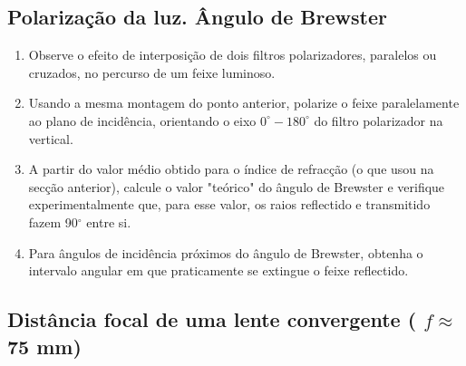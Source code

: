 \documentclass[a4paper,twoside,11pt]{report}      %
\begin{document}
\subsection{\sf Polarização da luz. Ângulo de Brewster}
\begin{enumerate}
\item Observe o efeito de interposição de dois filtros polarizadores, paralelos ou cruzados, no percurso de um feixe luminoso. 
\item Usando a mesma montagem do ponto anterior, polarize o feixe paralelamente ao plano
de incidência, orientando o eixo $0^\circ-180^\circ$ do filtro polarizador na vertical. 
\item A partir  do valor médio obtido para o índice de refracção (o que usou na secção anterior), calcule o valor "teórico" do ângulo de Brewster e verifique experimentalmente que, para esse valor, os raios reflectido e transmitido fazem 90$^\circ$ entre si. 
\item Para ângulos de incidência próximos do ângulo de Brewster, obtenha o  intervalo angular em que praticamente  se extingue o feixe reflectido. 
\end{enumerate}

\subsection{\sf Distância focal de uma lente convergente ( $f  \approx$ 75 mm) }
 
\end{document}

